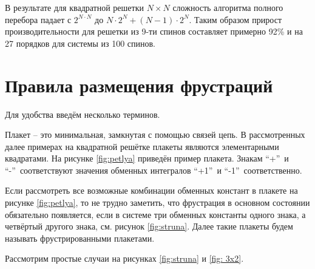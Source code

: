 \documentclass[utf8, babel, sor, jor, amsmath, amssymb, reprint]{elsarticle} %
\begin{document}
В результате для квадратной решетки $N \times N$ сложность алгоритма полного перебора падает с $2^{N \cdot N}$ до $N \cdot 2^N + (N - 1) \cdot 2^N$. Таким образом прирост производительности для решетки из 9-ти спинов составляет примерно 92\% и на 27 порядков для системы из 100 спинов.


\section{Правила размещения фрустраций}

Для удобства введём несколько терминов.

 Плакет – это минимальная, замкнутая с помощью связей цепь. В рассмотренных далее примерах на квадратной решётке плакеты являются элементарными квадратами. На рисунке \ref{fig:petlya} приведён пример плакета. Знакам \textquotedblleft +\textquotedblright ~и   \textquotedblleft -\textquotedblright ~соответствуют значения обменных интегралов  \textquotedblleft +1\textquotedblright ~и \textquotedblleft -1\textquotedblright ~соответственно.


Если рассмотреть все возможные комбинации обменных констант в плакете на рисунке \ref{fig:petlya}, то не трудно заметить, что фрустрация в основном состоянии обязательно появляется, если в системе три обменных константы одного знака, а четвёртый другого знака, см. рисунок \ref{fig:struna}. Далее такие плакеты будем называть фрустрированными плакетами.

Рассмотрим простые случаи на рисунках  \ref{fig:struna} и \ref{fig: 3x2}.
\end{document}
